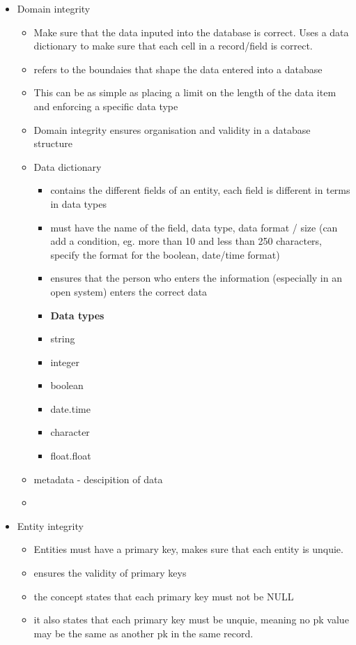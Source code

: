 \documentclass[12pt, a4, twoside]{article}
\begin{document}
\begin{center}
\begin{itemize}
\begin{itemize}
\begin{itemize}
      \end{itemize}
      \item Domain integrity 
      \begin{itemize}
        \item Make sure that the data inputed into the database is correct. Uses a data dictionary to make sure that each cell in a record/field is correct. 
        \item refers to the boundaies that shape the data entered into a database 
        \item This can be as simple as placing a limit on the length of the data item and enforcing a specific data type 
        \item Domain integrity ensures organisation and validity in a database structure 
        \item Data dictionary 
        \begin{itemize}
          \item contains the different fields of an entity, each field is different in terms in data types
          \item must have the name of the field, data type, data format / size (can add a condition, eg. more than 10 and less than 250 characters, specify the format for the boolean, date/time format)
          \item ensures that the person who enters the information (especially in an open system) enters the correct data
          \item \textbf{Data types}
          \item string 
          \item integer
          \item boolean 
          \item date.time
          \item character 
          \item float.float
        \end{itemize}
        \item metadata - descipition of data 
        \item 
      \end{itemize}
      \item Entity integrity 
      \begin{itemize}
        \item Entities must have a primary key, makes sure that each entity is unquie. 
        \item ensures the validity of primary keys 
        \item the concept states that each primary key must not be NULL 
        \item it also states that each primary key must be unquie, meaning no pk value may be the same as another pk in the same record. 
      \end{itemize}
    \end{itemize}


\end{itemize}
\end{center}
\end{document}
